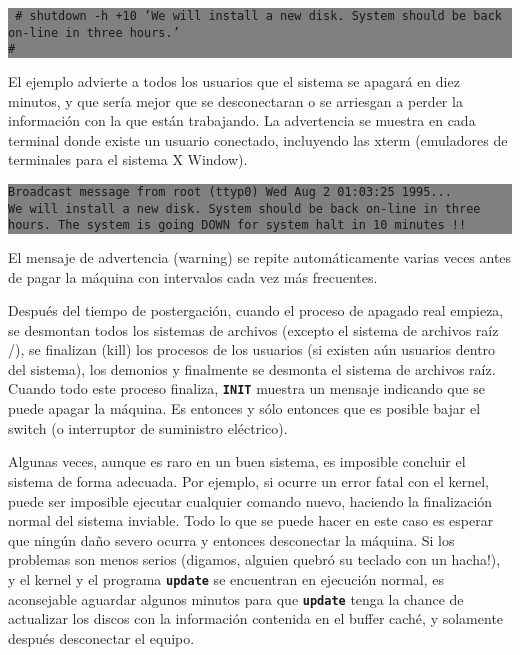 \documentclass[12pt]{article}
\begin{document}
\colorbox{grey}{\parbox[t]{0.95\linewidth}{ \vspace*{0.5cm} 
{\tt
\# shutdown -h +10 'We will install a new 
disk.  System should be back on-line in three hours.' \\
\#
} \vspace*{0.5cm} } } 

El ejemplo advierte a todos los usuarios que el sistema se apagará en diez
minutos, y que sería mejor que se desconectaran o se arriesgan a perder la
información con la que están trabajando. La advertencia se muestra en cada
terminal donde existe un usuario conectado, incluyendo las xterm (emuladores de
terminales para el sistema X Window).



\colorbox{grey}{\parbox[t]{0.95\linewidth}{ \vspace*{0.5cm} 
{\tt  Broadcast message from root (ttyp0) Wed Aug  2 01:03:25 1995... \\
We will install a new disk.  System should be back on-line in three hours.  The
system is going DOWN for system halt in 10 minutes !!   } \vspace*{0.5cm} } } 




El mensaje de advertencia (warning)
se repite automáticamente varias veces antes de pagar la máquina con
intervalos cada vez más frecuentes.

 Después del tiempo de postergación, cuando el proceso de apagado real
empieza, se desmontan todos los sistemas de archivos (excepto el sistema de
archivos raíz /), se finalizan (kill) los procesos de los usuarios (si existen
aún usuarios dentro del sistema), los demonios y finalmente se desmonta el
sistema de archivos raíz. Cuando todo este proceso finaliza,
\texttt{\textbf{INIT}} muestra un mensaje indicando que se puede apagar la
máquina. Es entonces y sólo entonces que es posible bajar el switch (o
interruptor de suministro eléctrico).

 Algunas veces, aunque es raro en un buen sistema, es imposible concluir
el sistema de forma adecuada. Por ejemplo, si ocurre un error fatal con el
kernel, puede ser imposible ejecutar cualquier comando nuevo, haciendo la
finalización normal del sistema inviable. Todo lo que se puede hacer en este
caso es esperar que ningún daño severo ocurra y entonces desconectar la máquina.
Si los problemas son menos serios (digamos, alguien quebró su teclado con un
hacha!), y el kernel y el programa \texttt{\textbf{update}} se encuentran en
ejecución normal, es aconsejable aguardar algunos minutos para que
\texttt{\textbf{update}} tenga la chance de actualizar los discos con la
información contenida en el buffer caché, y solamente después desconectar el
equipo.  
\end{document}
